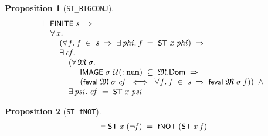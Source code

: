 \documentclass[letterpaper]{article}
\newtheorem{prop}{Proposition}
\renewcommand{\HOLConst}[1]{{\textsf{\upshape\small #1}}}
\newenvironment{holmath}{\begin{displaymath}\begin{array}{l}}{\end{array}\end{displaymath}\ignorespacesafterend}
\begin{document}
\begin{prop}[\texttt{ST_BIGCONJ}]
\begin{holmath}
  \ensuremath{\HOLTokenTurnstile}\HOLConst{FINITE}\;\HOLFreeVar{s}\;\HOLSymConst{\HOLTokenImp{}}\\
\;\;\;\;\;\HOLSymConst{\HOLTokenForall{}}\HOLBoundVar{x}.\\
\;\;\;\;\;\;\;\;\;(\HOLSymConst{\HOLTokenForall{}}\HOLBoundVar{f}.\;\HOLBoundVar{f}\;\HOLSymConst{\HOLTokenIn{}}\;\HOLFreeVar{s}\;\HOLSymConst{\HOLTokenImp{}}\;\HOLSymConst{\HOLTokenExists{}}\HOLBoundVar{phi}.\;\HOLBoundVar{f}\;\HOLSymConst{=}\;\HOLConst{ST}\;\HOLBoundVar{x}\;\HOLBoundVar{phi})\;\HOLSymConst{\HOLTokenImp{}}\\
\;\;\;\;\;\;\;\;\;\HOLSymConst{\HOLTokenExists{}}\HOLBoundVar{cf}.\\
\;\;\;\;\;\;\;\;\;\;\;\;\;(\HOLSymConst{\HOLTokenForall{}}\HOLBoundVar{\ensuremath{\mathfrak{M}}}\;\HOLBoundVar{\ensuremath{\sigma}}.\\
\;\;\;\;\;\;\;\;\;\;\;\;\;\;\;\;\;\;\HOLConst{IMAGE}\;\HOLBoundVar{\ensuremath{\sigma}}\;\ensuremath{\cal{U}}(:\HOLTyOp{num})\;\HOLSymConst{\HOLTokenSubset{}}\;\HOLBoundVar{\ensuremath{\mathfrak{M}}}.\HOLFieldName{Dom}\;\HOLSymConst{\HOLTokenImp{}}\\
\;\;\;\;\;\;\;\;\;\;\;\;\;\;\;\;\;\;(\HOLConst{feval}\;\HOLBoundVar{\ensuremath{\mathfrak{M}}}\;\HOLBoundVar{\ensuremath{\sigma}}\;\HOLBoundVar{cf}\;\HOLSymConst{\HOLTokenEquiv{}}\;\HOLSymConst{\HOLTokenForall{}}\HOLBoundVar{f}.\;\HOLBoundVar{f}\;\HOLSymConst{\HOLTokenIn{}}\;\HOLFreeVar{s}\;\HOLSymConst{\HOLTokenImp{}}\;\HOLConst{feval}\;\HOLBoundVar{\ensuremath{\mathfrak{M}}}\;\HOLBoundVar{\ensuremath{\sigma}}\;\HOLBoundVar{f}))\;\HOLSymConst{\HOLTokenConj{}}\\
\;\;\;\;\;\;\;\;\;\;\;\;\;\HOLSymConst{\HOLTokenExists{}}\HOLBoundVar{psi}.\;\HOLBoundVar{cf}\;\HOLSymConst{=}\;\HOLConst{ST}\;\HOLBoundVar{x}\;\HOLBoundVar{psi}
\end{holmath}
\end{prop}

\begin{prop}[\texttt{ST_fNOT}]
\begin{holmath}
  \ensuremath{\HOLTokenTurnstile}\HOLConst{ST}\;\HOLFreeVar{x}\;(\HOLSymConst{\HOLTokenNeg{}}\HOLFreeVar{f})\;\HOLSymConst{=}\;\HOLConst{fNOT}\;(\HOLConst{ST}\;\HOLFreeVar{x}\;\HOLFreeVar{f})
\end{holmath}
\end{prop}
\end{document}
